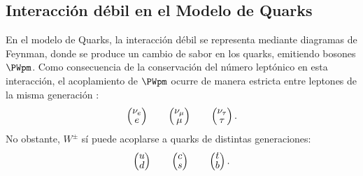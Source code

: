\subsection{Interacción débil en el Modelo de Quarks}\label{sec:weak_int_quarks}
En el modelo de Quarks, la interacción débil se representa mediante diagramas de Feynman, donde se produce un cambio de sabor en los quarks, emitiendo bosones $\PWpm$. Como consecuencia de la conservación del número leptónico en esta interacción, el acoplamiento de $\PWpm$ ocurre de manera estricta entre leptones de la misma generación \cite{Griffiths2008}: 
\begin{align}
\begingroup 
\renewcommand*{\arraystretch}{0.8}
\setlength\arraycolsep{10pt}
\begin{pmatrix} \nu _{e} \\ e \end{pmatrix} \qquad
\begin{pmatrix} \nu_{\mu } \\ \mu \end{pmatrix} \qquad
\begin{pmatrix} \nu_{\tau} \\ \tau \end{pmatrix} .
\endgroup
\end{align}
No obstante, $W^{\pm}$ sí puede acoplarse a quarks de distintas generaciones:
\begin{align}
\begingroup 
\renewcommand*{\arraystretch}{0.8}
\setlength\arraycolsep{10pt}
\begin{pmatrix} u \\ d \end{pmatrix} \qquad
\begin{pmatrix} c \\ s \end{pmatrix} \qquad
\begin{pmatrix} t \\ b \end{pmatrix} .
\endgroup
\end{align}

